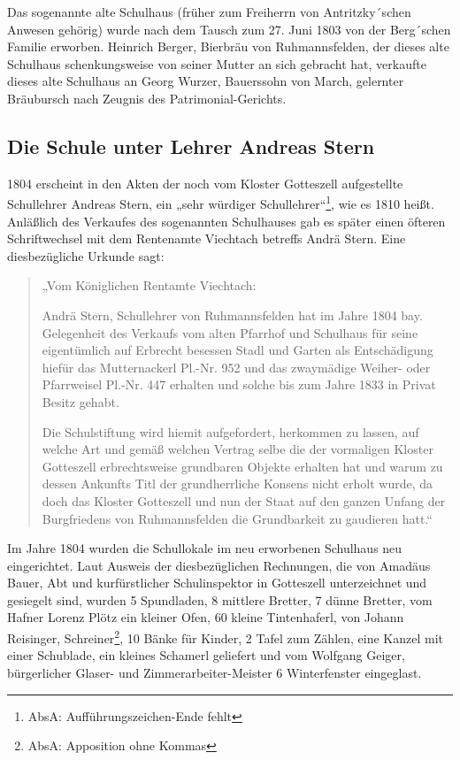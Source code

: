 \documentclass[12pt,a4paper]{book}
\begin{document}
Das sogenannte alte Schulhaus (früher zum Freiherrn von Antritzky´schen
Anwesen gehörig) wurde nach dem Tausch zum 27. Juni 1803 von der
Berg´schen Familie erworben. Heinrich Berger, Bierbräu von
Ruhmannsfelden, der dieses alte Schulhaus schenkungsweise von seiner
Mutter an sich gebracht hat, verkaufte dieses alte Schulhaus an Georg
Wurzer, Bauerssohn von March, gelernter Bräubursch nach Zeugnis des
Patrimonial-Gerichts.

\subsection[Die Schule unter Lehrer Andreas Stern]{Die Schule unter
Lehrer Andreas Stern\protect\footnotemark{}\protect{}}

1804 erscheint in den Akten der noch vom Kloster Gotteszell aufgestellte
Schullehrer Andreas Stern, ein „sehr würdiger
Schullehrer“\footnote{AbsA: Aufführungszeichen-Ende fehlt}, wie es 1810
heißt. Anläßlich des Verkaufes des sogenannten Schulhauses gab es später
einen öfteren Schriftwechsel mit dem Rentenamte Viechtach betreffs Andrä
Stern. Eine diesbezügliche Urkunde sagt:

\begin{quote}
„Vom Königlichen Rentamte Viechtach:

Andrä Stern, Schullehrer von Ruhmannsfelden hat im Jahre 1804 bay.
Gelegenheit des Verkaufs vom alten Pfarrhof und Schulhaus für seine
eigentümlich auf Erbrecht besessen Stadl und Garten als Entschädigung
hiefür das Mutternackerl Pl.-Nr. 952 und das zwaymädige Weiher- oder
Pfarrweisel Pl.-Nr. 447 erhalten und solche bis zum Jahre 1833 in Privat
Besitz gehabt.

Die Schulstiftung wird hiemit aufgefordert, herkommen zu lassen, auf
welche Art und gemäß welchen Vertrag selbe die der vormaligen Kloster
Gotteszell erbrechtsweise grundbaren Objekte erhalten hat und warum zu
dessen Ankunfts Titl der grundherrliche Konsens nicht erholt wurde, da
doch das Kloster Gotteszell und nun der Staat auf den ganzen Unfang der
Burgfriedens von Ruhmannsfelden die Grundbarkeit zu gaudieren hatt.“
\end{quote}

Im Jahre 1804 wurden die Schullokale im neu erworbenen Schulhaus neu
eingerichtet. Laut Ausweis der diesbezüglichen Rechnungen, die von
Amadäus Bauer, Abt und kurfürstlicher Schulinspektor in Gotteszell
unterzeichnet und gesiegelt sind, wurden 5 Spundladen, 8 mittlere
Bretter, 7 dünne Bretter, vom Hafner Lorenz Plötz ein kleiner Ofen, 60
kleine Tintenhaferl, von Johann Reisinger, Schreiner\footnote{AbsA:
Apposition ohne Kommas}, 10 Bänke für Kinder, 2 Tafel zum Zählen, eine
Kanzel mit einer Schublade, ein kleines Schamerl geliefert und vom
Wolfgang Geiger, bürgerlicher Glaser- und Zimmerarbeiter-Meister 6
Winterfenster eingeglast.
\end{document}
